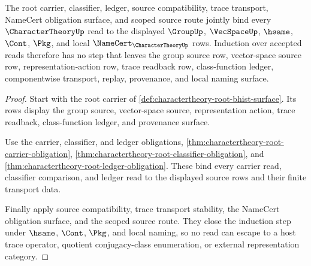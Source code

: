 \begin{theorem}
\label{thm:character-theory-scoped-source-induction}
The root carrier, classifier, ledger, source compatibility, trace transport, NameCert obligation surface, and scoped source route jointly bind every $\CharacterTheoryUp$ read to the displayed $\GroupUp$, $\VecSpaceUp$, $\hsame$, $\Cont$, $\Pkg$, and local $\NameCert_{\CharacterTheoryUp}$ rows. Induction over accepted reads therefore has no step that leaves the group source row, vector-space source row, representation-action row, trace readback row, class-function ledger, componentwise transport, replay, provenance, and local naming surface.
\end{theorem}
\begin{proof}
Start with the root carrier of \autoref{def:charactertheory-root-bhist-surface}. Its rows display the group source, vector-space source, representation action, trace readback, class-function ledger, and provenance surface.

Use the carrier, classifier, and ledger obligations, \autoref{thm:charactertheory-root-carrier-obligation}, \autoref{thm:charactertheory-root-classifier-obligation}, and \autoref{thm:charactertheory-root-ledger-obligation}. These bind every carrier read, classifier comparison, and ledger read to the displayed source rows and their finite transport data.

Finally apply source compatibility, trace transport stability, the NameCert obligation surface, and the scoped source route. They close the induction step under $\hsame$, $\Cont$, $\Pkg$, and local naming, so no read can escape to a host trace operator, quotient conjugacy-class enumeration, or external representation category.
\end{proof}

